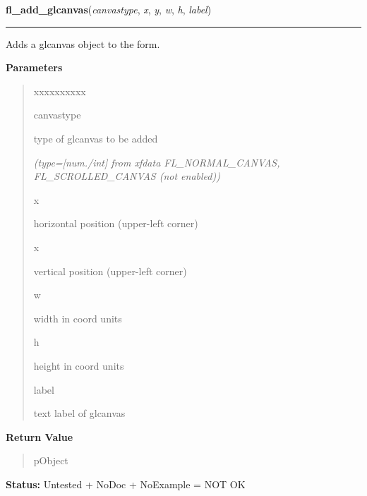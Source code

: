 \hspace{.8\funcindent}\begin{boxedminipage}{\funcwidth}

    \raggedright \textbf{fl\_add\_glcanvas}(\textit{canvastype}, \textit{x}, \textit{y}, \textit{w}, \textit{h}, \textit{label})

    \vspace{-1.5ex}

    \rule{\textwidth}{0.5\fboxrule}
\setlength{\parskip}{2ex}
    Adds a glcanvas object to the form.

\setlength{\parskip}{1ex}
      \textbf{Parameters}
      \vspace{-1ex}

      \begin{quote}
        \begin{Ventry}{xxxxxxxxxx}

          \item[canvastype]

          type of glcanvas to be added

            {\it (type=[num./int] from xfdata FL\_NORMAL\_CANVAS, FL\_SCROLLED\_CANVAS (not 
enabled))}

          \item[x]

          horizontal position (upper-left corner)

          \item[x]

          vertical position (upper-left corner)

          \item[w]

          width in coord units

          \item[h]

          height in coord units

          \item[label]

          text label of glcanvas

        \end{Ventry}

      \end{quote}

      \textbf{Return Value}
    \vspace{-1ex}

      \begin{quote}
      pObject

      \end{quote}

\textbf{Status:} Untested + NoDoc + NoExample = NOT OK



    \end{boxedminipage}

